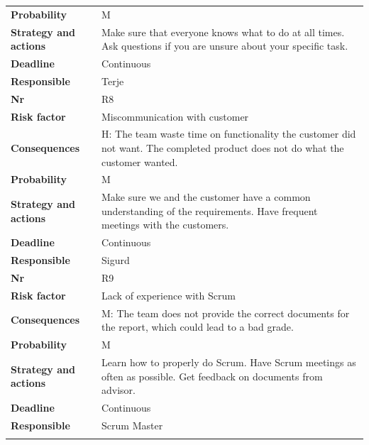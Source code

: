 \begin{longtable}{l p{9cm}}
\textbf{Probability} & M \\ 
\textbf{Strategy and actions} & Make sure that everyone knows what to do at all times. Ask questions if you are unsure about your specific task. \\
\textbf{Deadline} & Continuous \\
\textbf{Responsible} & Terje \\
\hline
\textbf{Nr} & R8 \\
\textbf{Risk factor} & Miscommunication with customer \\
\textbf{Consequences} & H: The team waste time on functionality the customer did not want. The completed product does not do what the customer wanted. \\
\textbf{Probability} & M \\ 
\textbf{Strategy and actions} & Make sure we and the customer have a common understanding of the requirements.
Have frequent meetings with the customers.  \\
\textbf{Deadline} & Continuous \\
\textbf{Responsible} & Sigurd \\
\hline
\textbf{Nr} & R9 \\
\textbf{Risk factor} & Lack of experience with Scrum \\
\textbf{Consequences} & M: The team does not provide the correct documents for the report, which could lead to a bad grade. \\
\textbf{Probability} & M \\ 
\textbf{Strategy and actions} & Learn how to properly do Scrum. Have Scrum meetings as often as possible. Get feedback on documents from advisor. \\
\textbf{Deadline} & Continuous \\
\textbf{Responsible} & Scrum Master \\
\hline
\label{tab:Risk}
\end{longtable}


